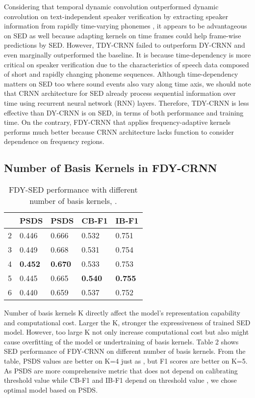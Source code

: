 \documentclass[a4paper]{article}
\begin{document}
Considering that temporal dynamic convolution outperformed dynamic convolution on text-independent speaker verification by extracting speaker information from rapidly time-varying phonemes \cite{tdycnn}, it appears to be advantageous on SED as well because adapting kernels on time frames could help frame-wise predictions by SED. However, TDY-CRNN failed to outperform DY-CRNN and even marginally outperformed the baseline. It is because time-dependency is more critical on speaker verification due to the characteristics of speech data composed of short and rapidly changing phoneme sequences. Although time-dependency matters on SED too where sound events also vary along time axis, we should note that CRNN architecture for SED already process sequential information over time using recurrent neural network (RNN) layers. Therefore, TDY-CRNN is less effective than DY-CRNN is on SED, in terms of both performance and training time. On the contrary, FDY-CRNN that applies frequency-adaptive kernels performs much better because CRNN architecture lacks function to consider dependence on frequency regions.


\subsection{Number of Basis Kernels in FDY-CRNN}
\begin{table}[t]
\caption{FDY-SED performance with different number of basis kernels, .}
\vspace{-5pt}
\centering
\setlength{\tabcolsep}{8.5pt}
\begin{tabular}{l|llll}
\hline
\textbf{} & \textbf{PSDS } & \textbf{PSDS } & \textbf{CB-F1 } & \textbf{IB-F1 } \\ \hline
2 & 0.446          & 0.666          & 0.532          & 0.751          \\
3 & 0.449          & 0.668          & 0.531          & 0.754          \\
4 & \textbf{0.452} & \textbf{0.670} & 0.533          & 0.753          \\
5 & 0.445          & 0.665          & \textbf{0.540} & \textbf{0.755} \\ 
6 & 0.440          & 0.659          & 0.537          & 0.752          \\
\hline
\end{tabular}
\vspace{-10pt}
\label{tab:kernels}
\end{table}

\vspace{-5pt}
Number of basis kernels K directly affect the model’s representation capability and computational cost. Larger the K, stronger the expressiveness of trained SED model. However, too large K not only increase computational cost but also might cause overfitting of the model or undertraining of basis kernels. Table 2 shows SED performance of FDY-CRNN on different number of basis kernels. From the table, PSDS values are better on K=4 just as \cite{dyconv}, but F1 scores are better on K=5. As PSDS are more comprehensive metric that does not depend on calibrating threshold value while CB-F1 and IB-F1 depend on threshold value \cite{PSDS, sedmetrics, insightdcase2020}, we chose optimal model based on PSDS.
\end{document}
